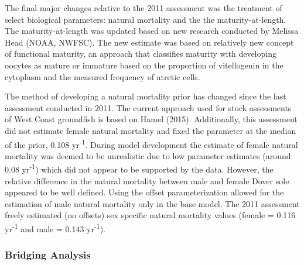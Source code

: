 \documentclass[11pt,
  english,
  a4paper,
]{article}
\begin{document}
\leavevmode\tagmcend\tagstructend\par


The final major changes relative to the 2011 assessment was the treatment of select biological parameters: natural mortality and the the maturity-at-length. The maturity-at-length was updated based on new research conducted by Melissa Head (NOAA, NWFSC). The new estimate was based on relatively new concept of functional maturity, an approach that classifies maturity with developing oocytes as mature or immature based on the proportion of vitellogenin in the cytoplasm and the measured frequency of atretic cells.

\leavevmode\tagmcend\tagstructend\par


The method of developing a natural mortality prior has changed since the last assessment conducted in 2011. The current approach used for stock assessments of West Coast groundfish is based on Hamel {(2015)\leavevmode\tagmcend\tagstructend}. Additionally, this assessment did not estimate female natural mortality and fixed the parameter at the median of the prior, 0.108 yr\textsuperscript{-1}. During model development the estimate of female natural mortality was deemed to be unrealistic due to low parameter estimates (around 0.08 yr\textsuperscript{-1}) which did not appear to be supported by the data. However, the relative difference in the natural mortality between male and female Dover sole appeared to be well defined. Using the offset parameterization allowed for the estimation of male natural mortality only in the base model. The 2011 assessment freely estimated (no offsets) sex specific natural mortality values (female = 0.116 yr\textsuperscript{-1} and male = 0.143 yr\textsuperscript{-1}).

\leavevmode\tagmcend\tagstructend\par


\hypertarget{bridging-analysis}{%
\subsubsection{Bridging Analysis}\label{bridging-analysis}}

\leavevmode\tagmcend\tagstructend
\end{document}
